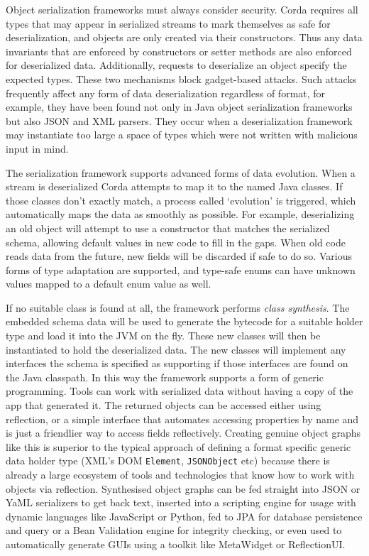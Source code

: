 \documentclass{article}
\begin{document}
Object serialization frameworks must always consider security. Corda requires all types that may appear in
serialized streams to mark themselves as safe for deserialization, and objects are only created via their
constructors. Thus any data invariants that are enforced by constructors or setter methods are also enforced for
deserialized data. Additionally, requests to deserialize an object specify the expected types. These two mechanisms
block gadget-based attacks\cite{DeserialisingPickles}. Such attacks frequently affect any form of data
deserialization regardless of format, for example, they have been found not only in Java object serialization
frameworks but also JSON and XML parsers. They occur when a deserialization framework may instantiate too large a
space of types which were not written with malicious input in mind.

The serialization framework supports advanced forms of data evolution. When a stream is deserialized Corda attempts
to map it to the named Java classes. If those classes don't exactly match, a process called `evolution' is
triggered, which automatically maps the data as smoothly as possible. For example, deserializing an old object will
attempt to use a constructor that matches the serialized schema, allowing default values in new code to fill in the
gaps. When old code reads data from the future, new fields will be discarded if safe to do so. Various forms of
type adaptation are supported, and type-safe enums can have unknown values mapped to a default enum value as well.

If no suitable class is found at all, the framework performs \emph{class synthesis}. The embedded schema data will
be used to generate the bytecode for a suitable holder type and load it into the JVM on the fly. These new classes
will then be instantiated to hold the deserialized data. The new classes will implement any interfaces the schema
is specified as supporting if those interfaces are found on the Java classpath. In this way the framework supports
a form of generic programming. Tools can work with serialized data without having a copy of the app that generated
it. The returned objects can be accessed either using reflection, or a simple interface that automates accessing
properties by name and is just a friendlier way to access fields reflectively. Creating genuine object graphs like
this is superior to the typical approach of defining a format specific generic data holder type (XML's DOM
\texttt{Element}, \texttt{JSONObject} etc) because there is already a large ecosystem of tools and technologies
that know how to work with objects via reflection. Synthesised object graphs can be fed straight into JSON or YaML
serializers to get back text, inserted into a scripting engine for usage with dynamic languages like JavaScript or
Python, fed to JPA for database persistence and query or a Bean Validation engine for integrity checking, or even
used to automatically generate GUIs using a toolkit like MetaWidget\cite{MetaWidget} or
ReflectionUI\cite{ReflectionUI}.
\end{document}
